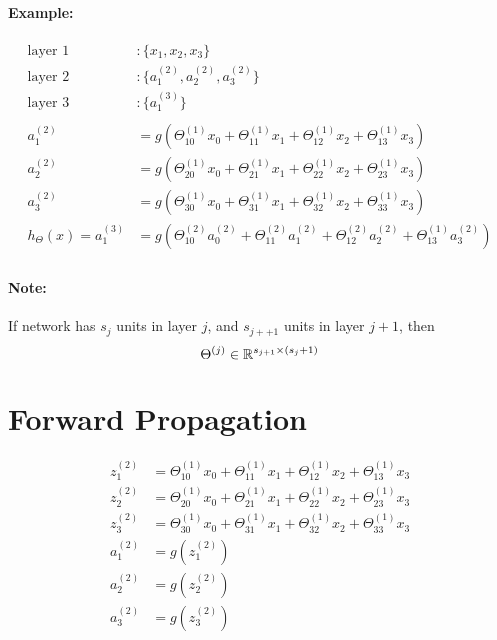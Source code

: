 \paragraph{Example:}
\begin{align*}
	\text{layer 1}          & : \{x_1, x_2, x_3\}                   \\
	\text{layer 2}          & : \{a_1^{(2)}, a_2^{(2)}, a_3^{(2)}\} \\
	\text{layer 3}          & : \{a_1^{(3)}\}                       \\
	\\
	a_1^{(2)}               & = g\left(
	\Theta_{10}^{(1)}x_0 + \Theta_{11}^{(1)}x_1 + \Theta_{12}^{(1)}x_2 + \Theta_{13}^{(1)}x_3
	\right)                                                         \\
	a_2^{(2)}               & = g\left(
	\Theta_{20}^{(1)}x_0 + \Theta_{21}^{(1)}x_1 + \Theta_{22}^{(1)}x_2 + \Theta_{23}^{(1)}x_3
	\right)                                                         \\
	a_3^{(2)}               & = g\left(
	\Theta_{30}^{(1)}x_0 + \Theta_{31}^{(1)}x_1 + \Theta_{32}^{(1)}x_2 + \Theta_{33}^{(1)}x_3
	\right)                                                         \\
	h_\Theta(x) = a_1^{(3)} & = g\left(
	\Theta_{10}^{(2)}a_0^{(2)} + \Theta_{11}^{(2)}a_1^{(2)} +
	\Theta_{12}^{(2)}a_2^{(2)} + \Theta_{13}^{(1)}a_3^{(2)}
	\right)                                                         \\
\end{align*}

\paragraph{Note:} If network has $s_j$ units in layer $j$, and $s_{j++1}$ units in
layer $j + 1$, then
\Large
$$
	\Theta^{(j)} \in \mathbb{R}^{s_{j+1} \times (s_j + 1)}
$$
\normalsize

\section{Forward Propagation}
\begin{align*}
	z_1^{(2)} & =
	\Theta_{10}^{(1)}x_0 + \Theta_{11}^{(1)}x_1 +
	\Theta_{12}^{(1)}x_2 + \Theta_{13}^{(1)}x_3 \\
	z_2^{(2)} & =
	\Theta_{20}^{(1)}x_0 + \Theta_{21}^{(1)}x_1 +
	\Theta_{22}^{(1)}x_2 + \Theta_{23}^{(1)}x_3 \\
	z_3^{(2)} & =
	\Theta_{30}^{(1)}x_0 + \Theta_{31}^{(1)}x_1 +
	\Theta_{32}^{(1)}x_2 + \Theta_{33}^{(1)}x_3 \\
	a_1^{(2)} & = g(z_1^{(2)})                  \\
	a_2^{(2)} & = g(z_2^{(2)})                  \\
	a_3^{(2)} & = g(z_3^{(2)})                  \\
\end{align*}
